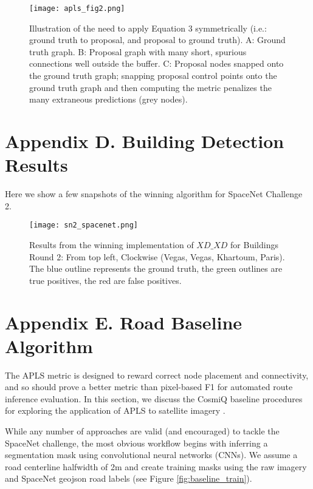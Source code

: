 \documentclass{article}
\begin{document}
\begin{figure}[h]
  \centering
     \texttt{[image: apls\_fig2.png]}
  \caption{Illustration of the need to apply Equation 3 symmetrically (i.e.: ground truth to proposal, and proposal to ground truth). A: Ground truth graph. B: Proposal graph with many short, spurious connections well outside the buffer. C: Proposal nodes snapped onto the ground truth graph; snapping proposal control points onto the ground truth graph and then computing the metric penalizes the many extraneous predictions (grey nodes).}
  \label{fig:apls_fig2}
\end{figure}

\clearpage
\newpage

\section{Appendix D.  Building Detection Results}

Here we show a few snapshots of the winning algorithm for SpaceNet Challenge 2.

\begin{figure}[h]
  \centering
     \texttt{[image: sn2\_spacenet.png]}
  \caption{Results from the winning implementation of $XD\_XD$ for Buildings Round 2: From top left, Clockwise (Vegas, Vegas, Khartoum, Paris). The blue outline represents the ground truth, the green outlines are true positives, the red are false positives.}
  \label{fig:sn2_spacenet}
\end{figure}

\clearpage
\newpage

\section{Appendix E.  Road Baseline Algorithm}
The APLS metric is designed to reward correct node placement and connectivity, and so should prove a better metric than pixel-based F1 for automated route inference evaluation. In this section, we discuss the CosmiQ baseline procedures for exploring the application of APLS to satellite imagery \cite{basiss}.


While any number of approaches are valid (and encouraged) to tackle the SpaceNet challenge, the most obvious workflow begins with inferring a segmentation mask using convolutional neural networks (CNNs).  We assume a road centerline halfwidth of 2m and create training masks using the raw imagery and SpaceNet geojson road labels (see Figure \ref{fig:baseline_train}).
\end{document}
